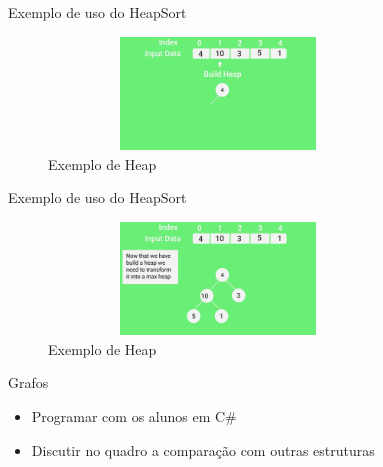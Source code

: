 \begin{frame}
	\begin{block}{Exemplo de uso do HeapSort}
		\begin{figure}[!htb]
			\centering	  				
			\includegraphics[height=3cm, width = 9cm]{./pic/scene005051.jpg}
			\caption{Exemplo de Heap}
		\end{figure}
	\end{block}
\end{frame}

\begin{frame}
	\begin{block}{Exemplo de uso do HeapSort}
		\begin{figure}[!htb]
			\centering	  				
			\includegraphics[height=3cm, width = 9cm]{./pic/scene007931.jpg}
			\caption{Exemplo de Heap}
		\end{figure}
	\end{block}
\end{frame}

\begin{frame}
	\begin{block}{Grafos}
		\begin{itemize}
			\item Programar com os alunos em C\#
			\item Discutir no quadro a comparação com outras estruturas
		\end{itemize}
	\end{block}
\end{frame}
